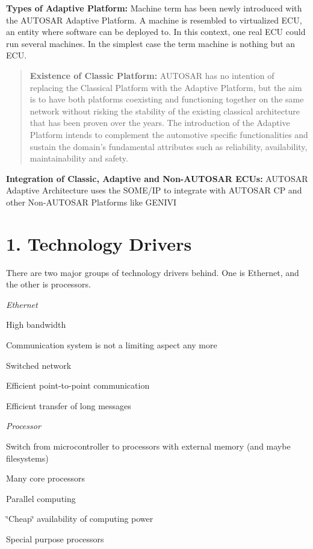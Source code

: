 {\bfseries Types of Adaptive Platform\+:} Machine term has been newly introduced with the A\+U\+T\+O\+S\+AR Adaptive Platform. A machine is resembled to virtualized E\+CU, an entity where software can be deployed to. In this context, one real E\+CU could run several machines. In the simplest case the term machine is nothing but an E\+CU.  \begin{quote}
{\bfseries Existence of Classic Platform\+:} A\+U\+T\+O\+S\+AR has no intention of replacing the Classical Platform with the Adaptive Platform, but the aim is to have both platforms coexisting and functioning together on the same network without risking the stability of the existing classical architecture that has been proven over the years. The introduction of the Adaptive Platform intends to complement the automotive specific functionalities and sustain the domain’s fundamental attributes such as reliability, availability, maintainability and safety. \end{quote}


{\bfseries Integration of Classic, Adaptive and Non-\/\+A\+U\+T\+O\+S\+AR E\+C\+Us\+:} A\+U\+T\+O\+S\+AR Adaptive Architecture uses the S\+O\+M\+E/\+IP to integrate with A\+U\+T\+O\+S\+AR CP and other Non-\/\+A\+U\+T\+O\+S\+AR Platforms like G\+E\+N\+I\+VI  \section*{1. Technology Drivers}

There are two major groups of technology drivers behind. One is Ethernet, and the other is processors.
\begin{DoxyItemize}
\item {\itshape Ethernet}
\begin{DoxyItemize}
\item High bandwidth
\item Communication system is not a limiting aspect any more
\item Switched network
\item Efficient point-\/to-\/point communication
\item Efficient transfer of long messages
\end{DoxyItemize}
\item {\itshape Processor}
\begin{DoxyItemize}
\item Switch from microcontroller to processors with external memory (and maybe filesystems)
\item Many core processors
\item Parallel computing
\item \char`\"{}\+Cheap\char`\"{} availability of computing power
\item Special purpose processors
\end{DoxyItemize}
\end{DoxyItemize}

